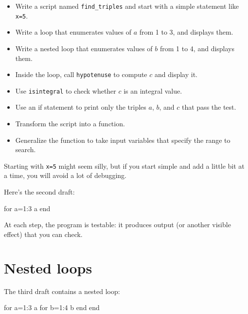 \documentclass[
]{book}
\numberwithin{Answer}{chapter}
\numberwithin{Exercise}{chapter}
\begin{document}
\begin{itemize}

\item Write a script named {\tt find\_triples} and start with a simple
statement like {\tt x=5}.

\item Write a loop that enumerates values of $a$ from 1 to 3, and
displays them.

\item Write a nested loop that enumerates values of $b$ from 1 to 4,
and displays them.

\item Inside the loop, call {\tt hypotenuse} to compute $c$ and
display it.

\item Use {\tt isintegral} to check whether $c$ is an integral
value.

\item Use an if statement to print only the triples $a$, $b$, and $c$
that pass the test.

\item Transform the script into a function.

\item Generalize the function to take input variables that
specify the range to search.

\end{itemize}

Starting with {\tt x=5} might seem
silly, but if you start simple and add a little bit at a time, you
will avoid a lot of debugging.

Here's the second draft:

\begin{code}
for a=1:3
    a
end
\end{code}

At each step, the program is testable: it produces output (or another
visible effect) that you can check.


\section{Nested loops}


The third draft contains a nested loop:

\begin{code}
for a=1:3
    a
    for b=1:4
        b
    end
end
\end{code}
\end{document}
